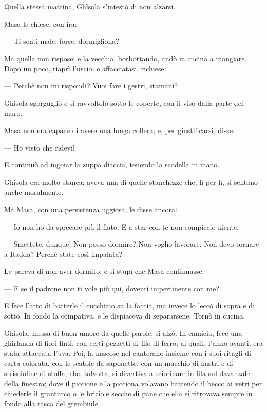 \chapter{}

Quella stessa mattina, Ghìsola s'intestò di non alzarsi.

Masa le chiese, con ira:

— Ti senti male, forse, dormigliona?

Ma quella non rispose; e la vecchia, borbottando, andò in cucina a mangiare. Dopo un poco, riaprì l'uscio; e affacciatasi, richiese:

— Perchè non mi rispondi? Vuoi fare i gestri, stamani?

Ghìsola sgorgugliò e si ravvoltolò sotto le coperte, con il viso dalla parte del muro.

Masa non era capace di avere una lunga collera; e, per giustificarsi, disse:

— Ho visto che ridevi!

E continuò ad ingoiar la zuppa diaccia, tenendo la scodella in mano.

Ghìsola era molto stanca; aveva una di quelle stanchezze che, lì per lì, si sentono anche moralmente.

Ma Masa, con una persistenza uggiosa, le disse ancora:

— Io non ho da sprecare più il fiato. E a star con te non compiccio niente.

— Smettete, dunque! Non posso dormire? Non voglio lavorare. Non devo tornare a Radda? Perchè state così impalata?

Le pareva di non aver dormito; e si stupì che Masa continuasse:

— E se il padrone non ti vole più qui, doventi impertinente con me?

E fece l'atto di batterle il cucchiaio su la faccia, ma invece lo leccò di sopra e di sotto. In fondo la compativa, e le dispiaceva di separarsene. Tornò in cucina.

Ghìsola, messa di buon umore da quelle parole, si alzò. In camicia, fece una ghirlanda di fiori finti, con certi pezzetti di filo di ferro; ai quali, l'anno avanti, era stata attaccata l'uva. Poi, la nascose nel canterano insieme con i suoi ritagli di carta colorata, con le scatole da saponette, con un mucchio di nastri e di striscioline di stoffa; che, talvolta, si divertiva a sciorinare in fila sul davanzale della finestra; dove il piccione e la picciona volavano battendo il becco ai vetri per chiederle il granturco o le briciole secche di pane che ella si ritrovava sempre in fondo alla tasca del grembiule.

